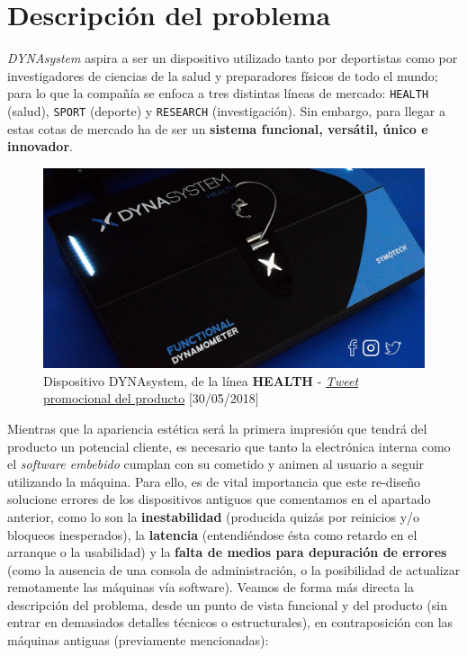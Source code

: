 \chapter{Descripción del problema}

\textit{DYNAsystem} aspira a ser un dispositivo utilizado tanto por deportistas como por investigadores de ciencias de la salud y preparadores físicos de todo el mundo; para lo que la compañía se enfoca a tres distintas líneas de mercado: \texttt{HEALTH} (salud), \texttt{SPORT} (deporte) y \texttt{RESEARCH} (investigación). Sin embargo, para llegar a estas cotas de mercado ha de ser un \textbf{sistema funcional, versátil, único e innovador}.\\

\begin{figure}[H]
	\centering
	\includegraphics[width=0.7\linewidth]{imagenes/dynasystem-blue-floor.jpeg}
	\caption{Dispositivo DYNAsystem, de la línea \textbf{HEALTH} - \href{https://twitter.com/dynasystem_/status/1001762762111021057}{\textit{Tweet} promocional del producto} [30/05/2018]}
	\label{dynasystem-health}
\end{figure}

Mientras que la apariencia estética será la primera impresión que tendrá del producto un potencial cliente, es necesario que tanto la electrónica interna como el \textit{software embebido} cumplan con su cometido y animen al usuario a seguir utilizando la máquina. Para ello, es de vital importancia que este re-diseño solucione errores de los dispositivos antiguos que comentamos en el apartado anterior, como lo son la \textbf{inestabilidad} (producida quizás por reinicios y/o bloqueos inesperados), la \textbf{latencia} (entendiéndose ésta como retardo en el arranque o la usabilidad) y la \textbf{falta de medios para depuración de errores} (como la ausencia de una consola de administración, o la posibilidad de actualizar remotamente las máquinas vía software). Veamos de forma más directa la descripción del problema, desde un punto de vista funcional y del producto (sin entrar en demasiados detalles técnicos o estructurales), en contraposición con las máquinas antiguas (previamente mencionadas):\\

